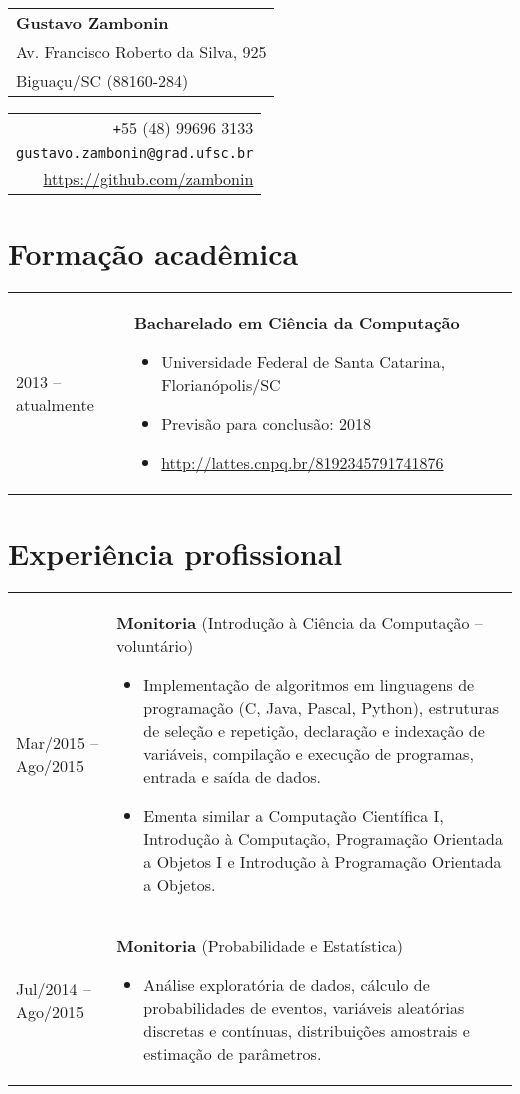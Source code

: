 \documentclass{article}
\newenvironment{contenttable}[1]{
    \section*{#1}
    \newcolumntype{L}{>{\bf \raggedleft}p{0.13\textwidth}}
    \newcolumntype{R}{p{0.82\textwidth}}
    \begin{tabular}{L!{\color{lightgray} \vrule}R}
}{
    \end{tabular}
}
\newenvironment{smallitem}{
    \vspace{-2mm}
    \begin{itemize}
    \setlength{\parskip}{0pt}
    \setlength{\itemsep}{2pt}
}{
    \vspace{-2mm}
    \end{itemize}
}
\begin{document}
\begin{tabular}{@{\hspace{-5mm}}l}
    {\Large \textbf{Gustavo Zambonin}} \\
    Av. Francisco Roberto da Silva, 925 \\
    Biguaçu/SC (88160-284)
\end{tabular}
\hfill
\begin{tabular}{r}
    \verb!+!55 (48) 99696 3133 \\
    \verb!gustavo.zambonin@grad.ufsc.br! \\
    \url{https://github.com/zambonin}
\end{tabular}

\begin{contenttable}{Formação acadêmica}
    2013 -- atualmente & \textbf{Bacharelado em Ciência da Computação}
    \begin{smallitem}
        \item Universidade Federal de Santa Catarina, Florianópolis/SC
        \item Previsão para conclusão: 2018
        \item \url{http://lattes.cnpq.br/8192345791741876}
    \end{smallitem}
\end{contenttable}

\begin{contenttable}{Experiência profissional}
    Mar/2015 -- Ago/2015 & \textbf{Monitoria} (Introdução à Ciência da
        Computação -- voluntário)
    \begin{smallitem}
        \item Implementação de algoritmos em linguagens de programação (C,
        Java, Pascal, Python), estruturas de seleção e repetição, declaração e
        indexação de variáveis, compilação e execução de programas, entrada e
        saída de dados.
        \item Ementa similar a Computação Científica I, Introdução à
        Computação, Programação Orientada a Objetos I e Introdução à
        Programação Orientada a Objetos.
    \end{smallitem} \\

    Jul/2014 -- Ago/2015 & \textbf{Monitoria} (Probabilidade e Estatística)
    \begin{smallitem}
        \item Análise exploratória de dados, cálculo de probabilidades de
        eventos, variáveis aleatórias discretas e contínuas, distribuições
        amostrais e estimação de parâmetros.
    \end{smallitem}
\end{contenttable}
\end{document}
